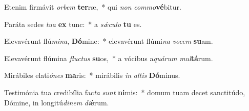 \item Etenim firmávit \textit{or}\textit{bem} \textbf{ter}ræ,~* qui \textit{non} \textit{com}\textit{mo}\textbf{vé}bitur.
\item Paráta sedes \textit{tu}\textit{a} \textbf{ex} tunc:~* a \textit{sǽ}\textit{cu}\textit{lo} \textbf{tu} es.
\item Elevavérunt flú\textit{mi}\textit{na}, \textbf{Dó}mine:~* elevavérunt flúmi\textit{na} \textit{vo}\textit{cem} \textbf{su}am.
\item Elevavérunt flúmina \textit{fluc}\textit{tus} \textbf{su}os,~* a vócibus a\textit{quá}\textit{rum} \textit{mul}\textbf{tá}rum.
\item Mirábiles elati\textit{ó}\textit{nes} \textbf{ma}ris:~* mirábilis \textit{in} \textit{al}\textit{tis} \textbf{Dó}minus.
\item Testimónia tua credibília fac\textit{ta} \textit{sunt} \textbf{ni}mis:~* domum tuam decet sanctitúdo, Dómine, in longitú\textit{di}\textit{nem} \textit{di}\textbf{é}rum.
